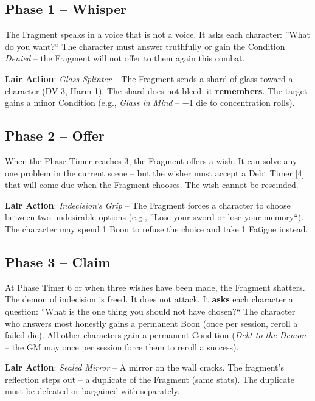 \subsection*{Phase 1 -- Whisper}

\noindent The Fragment speaks in a voice that is not a voice. It asks each character: ''What do you want?`` The character must answer truthfully or gain the Condition \emph{Denied} -- the Fragment will not offer to them again this combat.

\noindent\textbf{Lair Action}: \emph{Glass Splinter} -- The Fragment sends a shard of glass toward a character (DV 3, Harm 1). The shard does not bleed; it \textbf{remembers}. The target gains a minor Condition (e.g., \emph{Glass in Mind} -- −1 die to concentration rolls).

\subsection*{Phase 2 -- Offer}

\noindent When the Phase Timer reaches 3, the Fragment offers a wish. It can solve any one problem in the current scene -- but the wisher must accept a Debt Timer [4] that will come due when the Fragment chooses. The wish cannot be rescinded.

\noindent\textbf{Lair Action}: \emph{Indecision's Grip} -- The Fragment forces a character to choose between two undesirable options (e.g., ''Lose your sword or lose your memory``). The character may spend 1 Boon to refuse the choice and take 1 Fatigue instead.

\subsection*{Phase 3 -- Claim}

\noindent At Phase Timer 6 or when three wishes have been made, the Fragment shatters. The demon of indecision is freed. It does not attack. It \textbf{asks} each character a question: ''What is the one thing you should not have chosen?`` The character who answers most honestly gains a permanent Boon (once per session, reroll a failed die). All other characters gain a permanent Condition (\emph{Debt to the Demon} -- the GM may once per session force them to reroll a success).

\noindent\textbf{Lair Action}: \emph{Sealed Mirror} -- A mirror on the wall cracks. The fragment's reflection steps out -- a duplicate of the Fragment (same stats). The duplicate must be defeated or bargained with separately.

